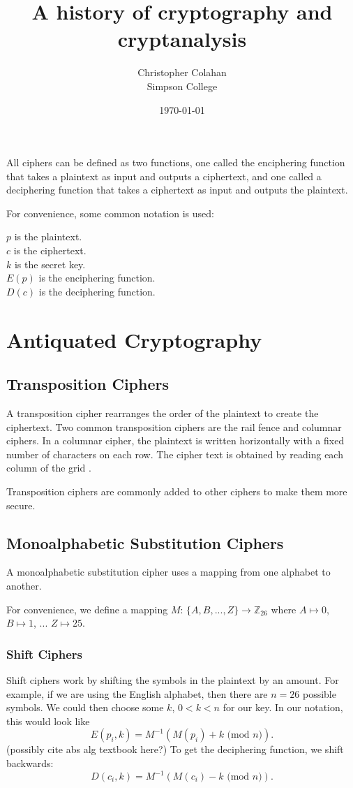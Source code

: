 \documentclass[12pt]{article}
\title{A history of cryptography and cryptanalysis}
\date{\today}
\author{Christopher Colahan\\ Simpson College}
\begin{document}
\maketitle
\newpage

\tableofcontents
\listoffigures
\newpage


All ciphers can be defined as two functions, one called the enciphering function that takes a plaintext as input and outputs a ciphertext, and one called a deciphering function that takes a ciphertext as input and outputs the plaintext.

For convenience, some common notation is used:

{\centering
	$p$ is the plaintext.\\
	$c$ is the ciphertext.\\
	$k$ is the secret key.\\
	$E(p)$ is the enciphering function.\\
	$D(c)$ is the deciphering function.\\
}

\section{Antiquated Cryptography}
\subsection{Transposition Ciphers}
A transposition cipher rearranges the order of the plaintext to create the ciphertext. Two common transposition ciphers are the rail fence and columnar ciphers. In a columnar cipher, the plaintext is written horizontally with a fixed number of characters on each row. The cipher text is obtained by reading each column of the grid \cite{appcrypt}.

Transposition ciphers are commonly added to other ciphers to make them more secure.

\subsection{Monoalphabetic Substitution Ciphers}

A monoalphabetic substitution cipher uses a mapping from one alphabet to another.

For convenience, we define a mapping $M$: $\{A,B,..., Z\} \rightarrow \mathbb{Z}_{26}$ where $A\mapsto 0$, $B\mapsto 1$, ... $Z\mapsto 25$.

\subsubsection{Shift Ciphers}
Shift ciphers work by shifting the symbols in the plaintext by an amount. For example, if we are using the English alphabet, then there are $n=26$ possible symbols. We could then choose some $k$, $0<k<n$ for our key. In our notation, this would look like
$$E(p_i,k)=M^{-1}(M(p_i)+k\text{ (mod $n$)}).$$ (possibly cite abs alg textbook here?)
To get the deciphering function, we shift backwards:
$$D(c_i,k)=M^{-1}(M(c_i)-k\text{ (mod $n$)}).$$
\end{document}
